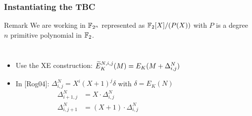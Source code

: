 \documentclass{beamer}
\begin{document}
	\begin{frame}
		\frametitle{Instantiating the TBC}

		\begin{alertblock}{Remark}
			We are working in $\F_{2^n}$ represented as $\F_2[X]/(P(X))$ with $P$ is a degree $n$ primitive polynomial in $\F_2$.
		\end{alertblock}

		\begin{columns}
			\begin{itemize}
				\item Use the XE construction: $\tE^{N,i,j}_{K}(M) = E_K(M + \Delta^N_{i,j})$
	
				\item In {[Rog04]}: $\Delta^N_{i,j} = X^i (X+1)^j \delta$ with $\delta = E_K(N)$ \\
				\begin{align*}
					\Delta^N_{i+1,j} &= X \cdot \Delta^N_{i,j} \\
					\Delta^N_{i,j+1} &= (X+1) \cdot \Delta^N_{i,j}
					\end{align*}		
		
				\end{itemize}
				\begin{tikzpicture}[
					scale=1,
					node distance=1.8cm,
					line width = 0.5pt,
					]
					
				\end{tikzpicture}
			\end{columns}
	\end{frame}
\end{document}
